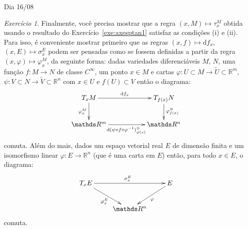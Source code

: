 \documentclass[oneside,11pt]{amsart}
\newcommand{\R}{\mathds R}
\newcommand{\dd}{\mathrm d}
\theoremstyle{remark}\newtheorem{exercise}{Exercício}[section]
\theoremstyle{plain}\newtheorem{teo}{Teorema}[section]
\theoremstyle{plain}\newtheorem{lem}[teo]{Lema}
\theoremstyle{plain}\newtheorem{prop}[teo]{Proposição}
\theoremstyle{definition}\newtheorem{defin}[teo]{Definição}
\theoremstyle{remark}\newtheorem{rem}[teo]{Observação}
\theoremstyle{definition}\newtheorem{example}[teo]{Exemplo}
\numberwithin{equation}{section}
\begin{document}
\begin{section}{Dia 16/08}
\begin{exercise}
Finalmente, você precisa mostrar que
a regra $(x,M)\mapsto\tau^M_x$ obtida usando o resultado do Exercício~\ref{exe:axesptan1} satisfaz as condições (i) e (ii). Para isso, é conveniente
mostrar primeiro que as regras $(x,f)\mapsto\dd f_x$, $(x,E)\mapsto\sigma^E_x$ podem ser pensadas como se fossem definidas a partir da regra
$(x,\varphi)\mapsto\varphi^M_x$, da seguinte forma: dadas variedades diferenciáveis $M$, $N$, uma função $f:M\to N$ de classe $C^\infty$, um ponto $x\in M$
e cartas $\varphi:U\subset M\to\widetilde U\subset\R^m$, $\psi:V\subset N\to\widetilde V\subset\R^n$ com $x\in U$ e $f(U)\subset V$ então o diagrama:
\[\xymatrix@C+30pt{%
T_xM\ar[r]^-{\dd f_x}\ar[d]_{\varphi^M_x}&T_{f(x)}N\ar[d]^{\varphi^N_{f(x)}}\\
\R^m\ar[r]_{\dd(\psi\circ f\circ\varphi^{-1})^\diamondsuit_{\varphi(x)}}&\R^n}\]
comuta. Além do mais, dados um espaço vetorial real $E$ de dimensão finita e um isomorfismo linear $\varphi:E\to\R^n$ (que é uma carta em $E$)
então, para todo $x\in E$, o diagrama:
\[\xymatrix{%
T_xE\ar[dr]_{\varphi^E_x}\ar[rr]^{\sigma^E_x}&&E\ar[dl]^\varphi\\
&\R^n}\]
comuta.
\end{exercise}

\end{section}
\end{document}
